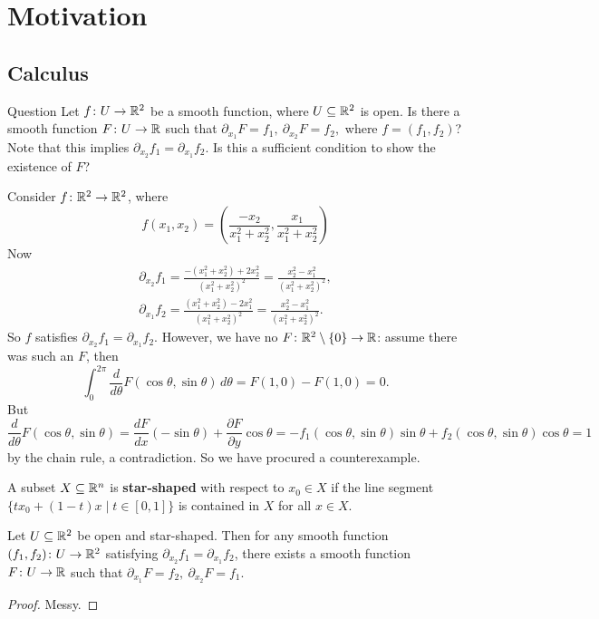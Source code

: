 \newcommand\sgn{\ensuremath{\operatorname{sgn}}} %

\section{Motivation}
\subsection{Calculus}
\begin{namedthing}{Question}
    Let $f \colon U \to \mathbb{R}^2$ be a smooth function, where $U \subseteq \mathbb{R}^2$ is open. Is there a smooth function $F \colon U \to \mathbb{R}$ such that $\partial _{x_1}F=f_1, \ \partial _{x_2}F=f_2,$ where $f=(f_1,f_2)$? Note that this implies $\partial _{x_2}f_1=\partial _{x_1}f_2$. Is this a sufficient condition to show the existence of $F$?
\end{namedthing}
\begin{example}\label{failure}
    Consider $f \colon \mathbb{R}^2 \to \mathbb{R}^2$, where \[
        f(x_1,x_2)= \left( \frac{-x_2}{x_1^2+x_2^2} , \frac{x_1}{x_1^2+x_2^2}\right) 
    \] Now  
    \begin{gather*}
        \partial _{x_2}f_1= \frac{-(x_1^2+x_2^2)+2x_2^2}{(x_1^2+x_2^2)^2}=\frac{x_2^2-x_1^2}{(x_1^2+x_2^2)^2},\\ 
        \partial _{x_1}f_2= \frac{(x_1^2+x_2^2)-2x_1^2}{(x_1^2+x_2^2)^2}=\frac{x_2^2-x_1^2}{(x_1^2+x_2^2)^2}.
    \end{gather*} So $f$ satisfies $\partial _{x_2}f_1=\partial _{x_1}f_2$. However, we have no $F \colon \mathbb{R}^2 \setminus \{0\} \to \mathbb{R}$: assume there was such an $F$, then \[
    \int_{0}^{2\pi } \frac{d}{d\theta}F(\cos \theta, \sin \theta) \, d\theta=F(1,0)-F(1,0)=0.
    \] But \[
    \frac{d}{d\theta}F( \cos \theta ,\sin  \theta)= \frac{dF}{dx}(-\sin \theta)+\frac{\partial F}{\partial y}\cos \theta=-f_1(\cos \theta, \sin \theta) \sin \theta+f_2 (\cos \theta, \sin \theta) \cos \theta=1
    \] by the chain rule, a contradiction. So we have procured a counterexample.
\end{example}
\begin{definition}
    A subset $X\subseteq \mathbb{R}^n $ is \textbf{star-shaped} with respect to $x_0\in X$ if the line segment $\{tx_0+(1-t)x\mid t \in [0,1]\} $ is contained in $X$ for all $x \in X$.
\end{definition}
\begin{theorem}\label{star}
    Let $U \subseteq \mathbb{R}^2$ be open and star-shaped. Then for any smooth function $(f_1,f_2) \colon U \to \mathbb{R}^2$ satisfying $\partial _{x_2}f_1=\partial _{x_1}f_2$, there exists a smooth function $F \colon U \to \mathbb{R}$ such that $\partial _{x_1}F=f_2, \ \partial _{x_2}F=f_1$.
\end{theorem}
\begin{proof}
    Messy.
\end{proof}


